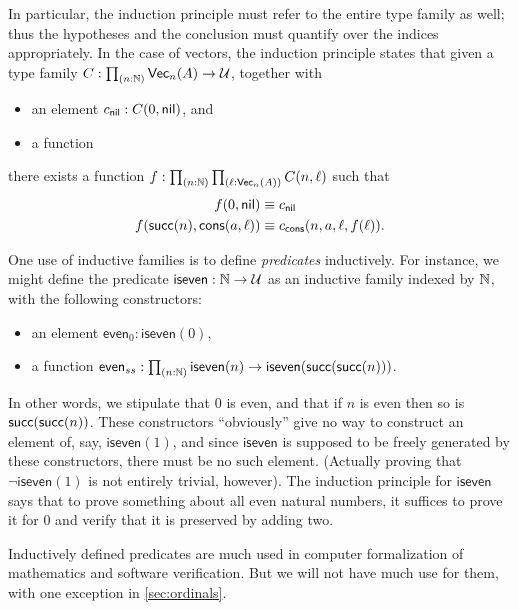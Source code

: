 In particular, the induction principle must refer to the entire type family as well; thus the hypotheses and the conclusion must quantify over the indices appropriately.
In the case of vectors, the induction principle states that given a type family $C:\prd{n:\nat} \vect n A \to \type$, together with
\begin{itemize}
\item an element $c_{\mathsf{nil}} : C(0,\mathsf{nil})$, and
\item a function 
\end{itemize}
there exists a function $f:\prd{n:\nat}{\ell:\vect n A} C(n,\ell)$ such that
\begin{align*}
  f(0,\mathsf{nil}) &\equiv c_{\mathsf{nil}}\\
  f(\mathsf{succ}(n),\mathsf{cons}(a,\ell)) &\equiv c_{\mathsf{cons}}(n,a,\ell,f(\ell)).
\end{align*}

%
%
One use of inductive families is to define \emph{predicates} inductively.
For instance, we might define the predicate $\mathsf{iseven}:\mathbb{N}\to\mathcal{U}$ as an inductive family indexed by $\mathbb{N}$, with the following constructors:
\begin{itemize}
\item an element $\mathsf{even}_0 : \mathsf{iseven}(0)$,
\item a function $\mathsf{even}_{ss} : \prd{n:\nat} \mathsf{iseven}(n) \to \mathsf{iseven}(\suc(\suc(n)))$.
\end{itemize}
In other words, we stipulate that $0$ is even, and that if $n$ is even then so is $\mathsf{succ}(\mathsf{succ}(n))$.
These constructors ``obviously'' give no way to construct an element of, say, $\mathsf{iseven}(1)$, and since $\mathsf{iseven}$ is supposed to be freely generated by these constructors, there must be no such element.
(Actually proving that $\neg \mathsf{iseven}(1)$ is not entirely trivial, however).
The induction principle for $\mathsf{iseven}$ says that to prove something about all even natural numbers, it suffices to prove it for $0$ and verify that it is preserved by adding two.

%
Inductively defined predicates are much used in computer formalization of mathematics and software verification.
But we will not have much use for them, with one exception in \autoref{sec:ordinals}.

